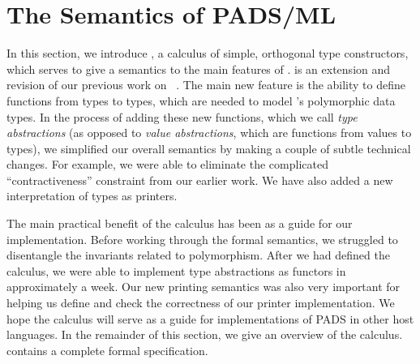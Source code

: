 \section{The Semantics of PADS/ML}
\label{sec:ddc}



In this section, we introduce \ddc{}, a calculus of simple, orthogonal
type constructors, which serves to give a semantics
to the main features of \padsml.  \ddc{} is an extension
and revision of our previous work on 
\ddcold{}~\cite{fisher+:next700ddl}.  The main new feature is 
the ability to define functions from types to types, 
which are needed to model \padsml's polymorphic data types.
In the process of adding these new functions, which we call {\em type
abstractions} (as opposed to {\em value abstractions}, which are functions 
from values to types), we simplified our overall semantics
by making a couple of subtle technical changes.  For example, we were
able to eliminate the complicated ``contractiveness'' constraint from our
earlier work.  We have also added a new interpretation of \ddc{} types
as printers.

The main practical benefit of the calculus has been as a guide for our
implementation. Before working through the formal semantics, we
struggled to disentangle the invariants related to polymorphism. After
we had defined the calculus, we were able to implement type
abstractions as \ocaml{} functors in approximately a week.  
Our new printing semantics was also very important for helping us define
and check the correctness of our printer implementation.  We hope
the calculus will serve as a guide for implementations of {\sc PADS} in
other host languages.
In the remainder of this section, we give an overview of the calculus.
 contains a complete formal specification.

